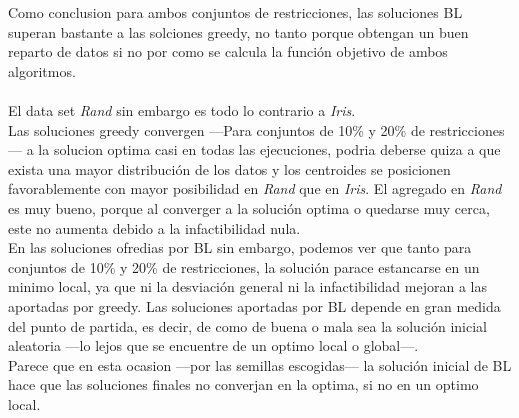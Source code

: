 Como conclusion para ambos conjuntos de restricciones, las soluciones BL superan bastante a las solciones greedy, no tanto porque obtengan un buen reparto de datos si no por como se calcula la función objetivo de ambos algoritmos.\\
\\
El data set \emph{Rand} sin embargo es todo lo contrario a \emph{Iris}.\\
Las soluciones greedy convergen ---Para conjuntos de 10\% y 20\% de restricciones--- a la solucion optima casi en todas las ejecuciones, podria deberse quiza a que exista una mayor distribución de los datos y los centroides se posicionen favorablemente con mayor posibilidad en \emph{Rand} que en \emph{Iris}. El agregado en \emph{Rand} es muy bueno, porque al converger a la solución optima o quedarse muy cerca, este no aumenta debido a la infactibilidad nula.\\
En las soluciones ofredias por BL sin embargo, podemos ver que tanto para conjuntos de 10\% y 20\% de restricciones, la solución parace estancarse en un minimo local, ya que ni la desviación general ni la infactibilidad mejoran a las aportadas por greedy. Las soluciones aportadas por BL depende en gran medida del punto de partida, es decir, de como de buena o mala sea la solución inicial aleatoria ---lo lejos que se encuentre de un optimo local o global---.\\
Parece que en esta ocasion ---por las semillas escogidas--- la solución inicial de BL hace que las soluciones finales no converjan en la optima, si no en un optimo local.

